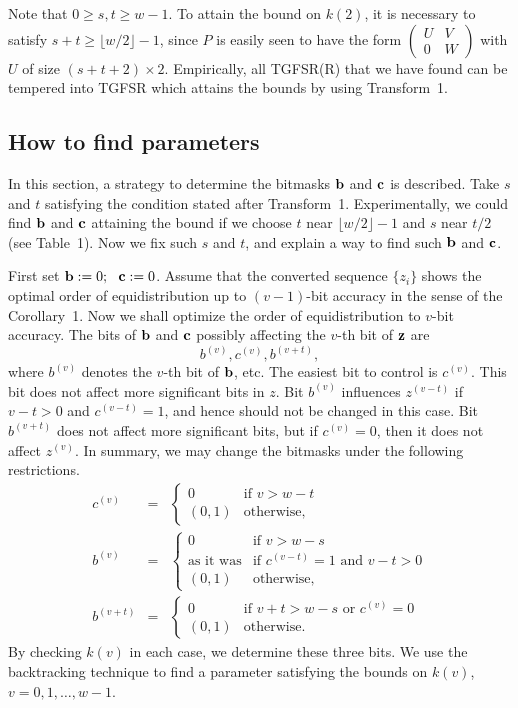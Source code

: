 Note that $0\geq s,t \geq w-1$. To attain the bound on $k(2)$,
it is necessary to satisfy
$s+t \geq \lfloor w/2 \rfloor -1$,
since $P$ is easily seen to have the form
$
 \left(
 \begin{array}{cc}
  U & V \\ 
  0 & W
 \end{array}
 \right)
$
with $U$ of size $(s+t+2)\times 2$.
Empirically, all TGFSR(R) that we have found
can be tempered into TGFSR which attains the bounds by using Transform~1.

\subsection{How to find parameters}
In this section, a strategy
to determine the bitmasks ${\bf b}$ and ${\bf c}$ is described.
Take $s$ and $t$ satisfying the condition stated after 
Transform~1.
Experimentally, we could find ${\bf b}$ and ${\bf c}$ attaining
the bound if we choose $t$ near $\lfloor w/2 \rfloor -1$ and
$s$ near $t/2$ (see Table~1).
Now we fix such $s$ and $t$, and explain a way to find 
such ${\bf b}$ and ${\bf c}$.

First set ${\bf b}:=0;\ \  {\bf c}:=0$.
Assume that the converted sequence 
$\{z_i\}$ shows the optimal order of equidistribution
up to $(v-1)$-bit accuracy in the sense of 
the Corollary~1.
Now we shall optimize the order of equidistribution to $v$-bit 
accuracy.
The bits of ${\bf b}$ and ${\bf c}$ possibly affecting the
$v$-th bit of ${\bf z}$ are
$$
b^{(v)}, c^{(v)}, b^{(v+t)},
$$
where $b^{(v)}$
denotes the $v$-th bit of ${\bf b}$, etc.
The easiest bit to control is $c^{(v)}$.
This bit does not affect more significant bits in $z$.
Bit $b^{(v)}$ influences $z^{(v-t)}$
if $v-t>0$ and $c^{(v-t)}=1$, and hence
should not be changed in this case.
Bit $b^{(v+t)}$ does not affect more significant bits,
but if $c^{(v)}=0$, then it does not affect $z^{(v)}$.
In summary, we may change the bitmasks under the following
restrictions.
\begin{eqnarray*}
c^{(v)} & = & \left\{ \begin{array}{ll}
			0 & \mbox{if $v > w-t$} \\
			(0, 1) & \mbox{otherwise},
			\end{array} \right. \\
b^{(v)} & = & \left\{ \begin{array}{ll}
0 & \mbox{if $v > w-s$} \\
\mbox{as it was} & \mbox{if $c^{(v-t)}=1$ and $v-t>0$}\\
(0, 1) & \mbox{otherwise}, 
\end{array} \right. \\
b^{(v+t)} & = & \left\{ \begin{array}{ll}
0 & \mbox{if $v+t > w-s$ or $c^{(v)}=0$} \\
(0, 1) & \mbox{otherwise.} 
\end{array} \right. 
\end{eqnarray*}
By checking $k(v)$ in each case, we determine these three bits.
We use the backtracking technique to find a parameter
satisfying the bounds on $k(v)$, $v=0,1,\ldots,w-1$. 

